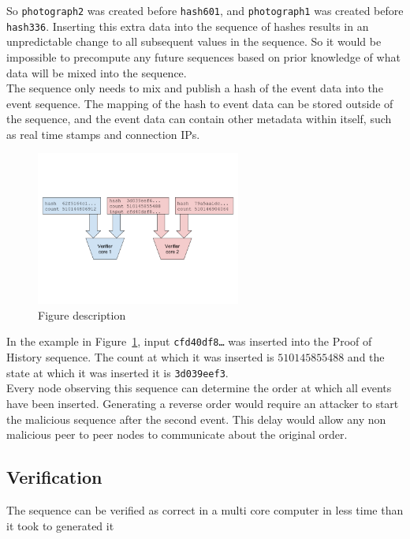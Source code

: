 \documentclass[12pt]{article}
\begin{document}
So \texttt{photograph2} was created before \texttt{hash601}, and
\texttt{photograph1} was created before \texttt{hash336}. Inserting this extra data into the sequence of hashes results in an unpredictable change to all subsequent values in the sequence. So it would be impossible to precompute any future sequences based on prior knowledge of what data will be mixed into the sequence.\\

The sequence only needs to mix and publish a hash of the event data into the event sequence. The mapping of the hash to event data can be stored outside of the sequence, and the event data can contain other metadata within itself, such as real time stamps and connection IPs.\\

\begin{figure}
  \begin{center}
    \centering
    \includegraphics[width=0.6\textwidth]{figures/fig_3.png}
    \caption[Fig 3]{Figure description \label{fig:poh_insert}}
  \end{center}
  \end{figure}

  In the example in Figure~\ref{fig:poh_insert}, input \texttt{cfd40df8\ldots} was inserted into the Proof of History sequence. The count at which it was inserted is $510145855488$ and the state at which it was inserted it is \texttt{3d039eef3}.\\

Every node observing this sequence can determine the order at which all events have been inserted. Generating a reverse order would require an attacker to start the malicious sequence after the second event. This delay would allow any non malicious peer to peer nodes to communicate about the original order.\\

\subsection{Verification}
The sequence can be verified as correct in a multi core computer in less time than it took to generated it \\
\end{document}
